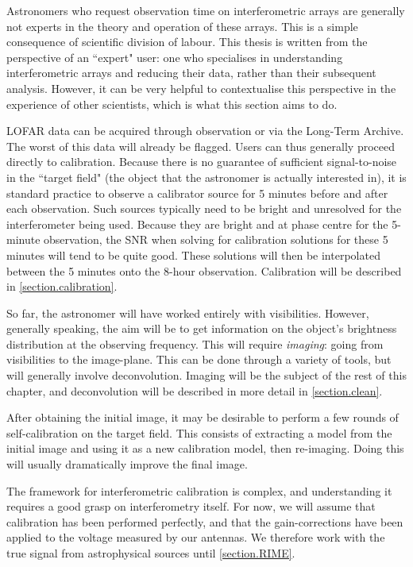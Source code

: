 \pg
Astronomers who request observation time on interferometric arrays are generally not experts in the theory and operation of these arrays. This is a simple consequence of scientific division of labour. This thesis is written from the perspective of an ``expert" user: one who specialises in understanding interferometric arrays and reducing their data, rather than their subsequent analysis. However, it can be very helpful to contextualise this perspective in the experience of other scientists, which is what this section aims to do.

\pg
LOFAR data can be acquired through observation or via the Long-Term Archive. The worst of this data will already be flagged. Users can thus generally proceed directly to calibration. Because there is no guarantee of sufficient signal-to-noise in the ``target field" (the object that the astronomer is actually interested in), it is standard practice to observe a calibrator source for 5 minutes before and after each observation. Such sources typically need to be bright and unresolved for the interferometer being used. Because they are bright and at phase centre for the 5-minute observation, the SNR when solving for calibration solutions for these 5 minutes will tend to be quite good. These solutions will then be interpolated between the 5 minutes onto the 8-hour observation. Calibration will be described in \cref{section.calibration}.

\pg
So far, the astronomer will have worked entirely with visibilities. However, generally speaking, the aim will be to get information on the object's brightness distribution at the observing frequency. This will require \emph{imaging}: going from visibilities to the image-plane. This can be done through a variety of tools, but will generally involve deconvolution. Imaging will be the subject of the rest of this chapter, and deconvolution will be described in more detail in \cref{section.clean}.

\pg
After obtaining the initial image, it may be desirable to perform a few rounds of self-calibration  on the target field. This consists of extracting a model from the initial image and using it as a new calibration model, then re-imaging. Doing this will usually dramatically improve the final image. 

\pg
The framework for interferometric calibration is complex, and understanding it requires a good grasp on interferometry itself. For now, we will assume that calibration has been performed perfectly, and that the gain-corrections have been applied to the voltage measured by our antennas. We therefore work with the true signal from astrophysical sources until \cref{section.RIME}.



